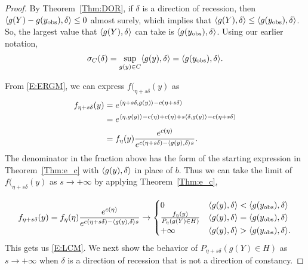 \begin{proof}
By Theorem~\ref{Thm:DOR}, if $\delta$ is a direction of recession, then 
$\langle g(Y) - g(y_{\textrm{obs}}), \delta \rangle \leq 0$ almost surely, which implies 
that $\langle g(Y), \delta \rangle \leq \langle g(y_{\textrm{obs}}), \delta \rangle$.  
So, the largest value that $\langle g(Y), \delta \rangle$ can take is 
$\langle g(y_{\textrm{obs}}), \delta \rangle$.  Using our earlier notation, 
\begin{align*}
\sigma_C(\delta) = \sup_{g(y) \in C}\langle g(y), \delta \rangle = 
\langle g(y_{\textrm{obs}}), \delta \rangle.
\end{align*}

From \eqref{E:ERGM}, we can express $f(_{\eta+s\delta}(y)$ as
\begin{align*}
 f_{\eta+s\delta}(y) &= e^{ \langle \eta+s\delta,g(y) \rangle - c(\eta+s\delta)  } \\
 &= e^{ \langle \eta,g(y) \rangle -c(\eta)+c(\eta) + s\langle \delta,g(y) \rangle - c(\eta+s\delta) } \\
 	&= f_\eta(y) \frac{e^{c(\eta)}}{e^{ c(\eta+s\delta) - \langle g(y),\delta \rangle
s } }.
\end{align*}
The denominator in the fraction above has the form of the starting expression in 
Theorem~\ref{Thm:e_c} with $\langle g(y),\delta \rangle$ in place of $b$.
Thus we can take the limit of $f(_{\eta+s\delta}(y)$ as
$s \to +\infty$ by applying Theorem~\ref{Thm:e_c},

\begin{align*}
	f_{\eta+s\delta}(y) = f_\eta(\eta) \frac{e^{c(\eta)}}{e^{ c(\eta+s
\delta) - \langle g(y),\delta \rangle s } } 
	\to	
			\begin{cases} 
			0 					& \langle g(y),\delta \rangle < \langle g(y_{\textrm{obs}}),\delta \rangle \\
			\frac{f_\eta(y)}{P_\eta(g(Y) \in H)} 	& 
								\langle g(y),\delta \rangle = \langle g(y_{\textrm{obs}}),\delta \rangle \\
			+\infty				& \langle g(y),\delta \rangle > \langle g(y_{\textrm{obs}}),\delta \rangle.
			\end{cases}
\end{align*}
This gets us \eqref{E:LCM}.  We next show the behavior of 
$P_{\eta+s\delta}(g(Y) \in H)$ as $s \to +\infty$ when $\delta$ is a direction of
recession that is not a direction of constancy.


\end{proof}
